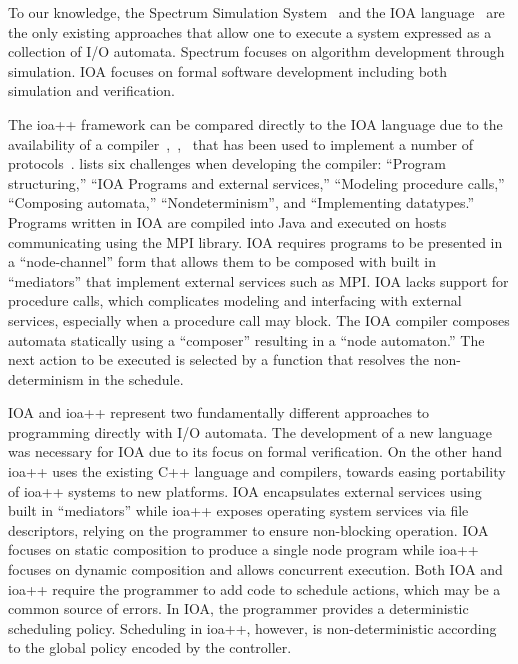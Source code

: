 To our knowledge, the Spectrum Simulation System~\cite{goldman1990distributed} and the IOA language~\cite{garland2003ioa} are the only existing approaches that allow one to execute a system expressed as a collection of I/O automata.
Spectrum focuses on algorithm development through simulation.
IOA focuses on formal software development including both simulation and verification.

The ioa++ framework can be compared directly to the IOA language due to the availability of a compiler~\cite{tsai2002code},~\cite{tauber2004verifiable},~\cite{tauber2004compiling} that has been used to implement a number of protocols~\cite{georgiou2009automated}.
\cite{georgiou2009automated} lists six challenges when developing the compiler: ``Program structuring,'' ``IOA Programs and external services,'' ``Modeling procedure calls,'' ``Composing automata,'' ``Nondeterminism'', and ``Implementing datatypes.''
Programs written in IOA are compiled into Java and executed on hosts communicating using the MPI library.
IOA requires programs to be presented in a ``node-channel'' form that allows them to be composed with built in ``mediators'' that implement external services such as MPI.
IOA lacks support for procedure calls, which complicates modeling and interfacing with external services, especially when a procedure call may block.
The IOA compiler composes automata statically using a ``composer'' resulting in a ``node automaton.''
The next action to be executed is selected by a function that resolves the non-determinism in the schedule.

IOA and ioa++ represent two fundamentally different approaches to programming directly with I/O automata.
The development of a new language was necessary for IOA due to its focus on formal verification.
On the other hand ioa++ uses the existing C++ language and compilers, towards easing portability of ioa++ systems to new platforms.
IOA encapsulates external services using built in ``mediators'' while ioa++ exposes operating system services via file descriptors, relying on the programmer to ensure non-blocking operation.
IOA focuses on static composition to produce a single node program while ioa++ focuses on dynamic composition and allows concurrent execution.
Both IOA and ioa++ require the programmer to add code to schedule actions, which may be a common source of errors.
In IOA, the programmer provides a deterministic scheduling policy.
Scheduling in ioa++, however, is non-deterministic according to the global policy encoded by the controller.

